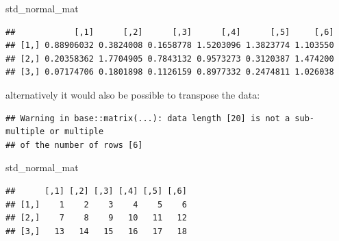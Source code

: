 \documentclass[]{article}
\newenvironment{Shaded}{}{}
\newcommand{\DataTypeTok}[1]{\textcolor[rgb]{0.56,0.13,0.00}{#1}}
\newcommand{\DecValTok}[1]{\textcolor[rgb]{0.25,0.63,0.44}{#1}}
\newcommand{\KeywordTok}[1]{\textcolor[rgb]{0.00,0.44,0.13}{\textbf{#1}}}
\newcommand{\NormalTok}[1]{#1}
\newcommand{\OperatorTok}[1]{\textcolor[rgb]{0.40,0.40,0.40}{#1}}
\newcommand{\StringTok}[1]{\textcolor[rgb]{0.25,0.44,0.63}{#1}}
\begin{document}
\begin{Shaded}
\begin{Highlighting}[]
\NormalTok{std_normal_mat}
\end{Highlighting}
\end{Shaded}

\begin{verbatim}
##            [,1]      [,2]      [,3]      [,4]      [,5]     [,6]
## [1,] 0.88906032 0.3824008 0.1658778 1.5203096 1.3823774 1.103550
## [2,] 0.20358362 1.7704905 0.7843132 0.9573273 0.3120387 1.474200
## [3,] 0.07174706 0.1801898 0.1126159 0.8977332 0.2474811 1.026038
\end{verbatim}

alternatively it would also be possible to transpose the data:

\begin{Shaded}
\end{Shaded}

\begin{verbatim}
## Warning in base::matrix(...): data length [20] is not a sub-multiple or multiple
## of the number of rows [6]
\end{verbatim}

\begin{Shaded}
\begin{Highlighting}[]
\NormalTok{std_normal_mat}
\end{Highlighting}
\end{Shaded}

\begin{verbatim}
##      [,1] [,2] [,3] [,4] [,5] [,6]
## [1,]    1    2    3    4    5    6
## [2,]    7    8    9   10   11   12
## [3,]   13   14   15   16   17   18
\end{verbatim}

\begin{Shaded}
\end{Shaded}
\end{document}
